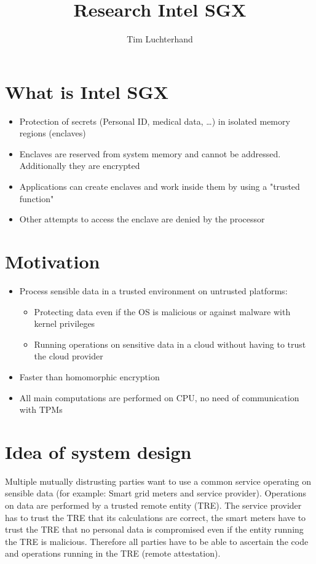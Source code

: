 \documentclass[DIN, pagenumber=false, fontsize=11pt, parskip=half]{scrartcl}
\title{Research Intel SGX}
\author{Tim Luchterhand}
\begin{document}
    \maketitle
    \section{What is Intel SGX}
    \begin{itemize}
        \item Protection of secrets (Personal ID, medical data, \dots) in isolated memory regions (enclaves)
        \item Enclaves are reserved from system memory and cannot be addressed. Additionally they are encrypted
        \item Applications can create enclaves and work inside them by using a "trusted function"
        \item Other attempts to access the enclave are denied by the processor
    \end{itemize}

    \section{Motivation}
    \begin{itemize}
        \item Process sensible data in a trusted environment on untrusted platforms:
            \begin{itemize}
                \item Protecting data even if the OS is malicious or against malware with kernel privileges
                \item Running operations on sensitive data in a cloud without having to trust the cloud provider
            \end{itemize}
        \item Faster than homomorphic encryption
        \item All main computations are performed on CPU, no need of communication with TPMs
    \end{itemize}

    \section{Idea of system design}
    Multiple mutually distrusting parties want to use a common service operating on sensible data (for example: Smart
    grid meters and service provider). Operations on data are performed by a trusted remote entity (TRE). The service
    provider has to trust the TRE that its calculations are correct, the smart meters have to trust the TRE that no personal
    data is compromised even if the entity running the TRE is malicious. Therefore all parties have to be able to ascertain 
    the code and operations running in the TRE (remote attestation).
\end{document}
